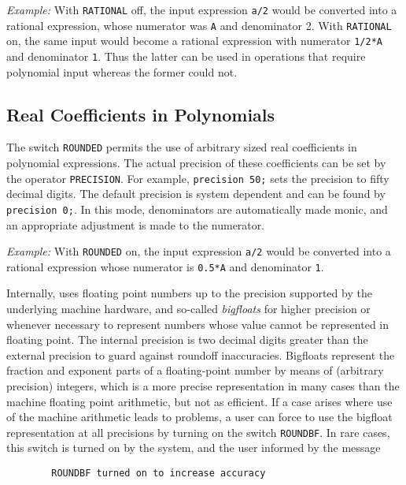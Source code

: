 {\it Example:} With {\tt RATIONAL} off, the input expression {\tt a/2}
would be converted into a rational expression, whose numerator was {\tt A}
and denominator 2.  With {\tt RATIONAL} on, the same input would become a
rational expression with numerator {\tt 1/2*A} and denominator {\tt 1}.
Thus the latter can be used in operations that require polynomial input
whereas the former could not.

\subsection{Real Coefficients in Polynomials}
\hypertarget{switch:ROUNDED}{}
\hypertarget{switch:ROUNDBF}{}
\hypertarget{operator:PRECISION}{}
The switch {\tt ROUNDED} permits the use of arbitrary
sized real coefficients in polynomial expressions.  The actual precision
of these coefficients can be set by the operator {\tt PRECISION}.
 For example, {\tt precision 50;} sets the precision to
fifty decimal digits.  The default precision is system dependent and can
be found by {\tt precision 0;}.  In this mode, denominators are
automatically made monic, and an appropriate adjustment is made to the
numerator.

{\it Example:} With {\tt ROUNDED} on, the input expression {\tt a/2} would
be converted into a rational expression whose numerator is {\tt 0.5*A} and
denominator {\tt 1}.

Internally, {\REDUCE} uses floating point numbers up to the precision
supported by the underlying machine hardware, and so-called {\em
bigfloats} for higher precision or whenever necessary to represent numbers
whose value cannot be represented in floating point.  The internal
precision is two decimal digits greater than the external precision to
guard against roundoff inaccuracies.  Bigfloats represent the fraction and
exponent parts of a floating-point number by means of (arbitrary
precision) integers, which is a more precise representation in many cases
than the machine floating point arithmetic, but not as efficient.  If a
case arises where use of the machine arithmetic leads to problems, a user
can force {\REDUCE} to use the bigfloat representation at all precisions by
turning on the switch {\tt ROUNDBF}.  In rare cases,
this switch is turned on by the system, and the user informed by the
message
\begin{verbatim}
        ROUNDBF turned on to increase accuracy
\end{verbatim}

